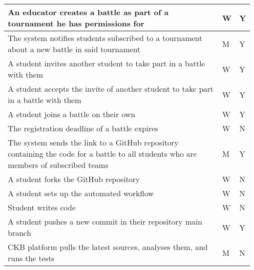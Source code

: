\begin{longtable}{|p{8.7cm}|p{3cm}|p{3cm}|}
    An educator creates a battle as part of a tournament he has permissions for                                                           & W                      & Y               \\ \hline
    The system notifies students subscribed to a tournament about a new battle in said tournament                                         & M                      & Y               \\ \hline
    A student invites another student to take part in a battle with them                                                                  & W                      & Y               \\ \hline
    A student accepts the invite of another student to take part in a battle with them                                                    & W                      & Y               \\ \hline
    A student joins a battle on their own                                                                                                 & W                      & Y               \\ \hline
    The registration deadline of a battle expires                                                                                         & W                      & N               \\ \hline
    The system sends the link to a GitHub repository containing the code for a battle to all students who are members of subscribed teams & M                      & Y               \\ \hline
    A student forks the GitHub repository                                                                                                 & W                      & N               \\ \hline
    A student sets up the automated workflow                                                                                              & W                      & N               \\ \hline
    Student writes code                                                                                                                   & W                      & N               \\ \hline
    A student pushes a new commit in their repository main branch                                                                         & W                      & Y               \\ \hline
    CKB platform pulls the latest sources, analyses them, and runs the tests                                                              & M                      & N               \\ \hline

\end{longtable}
